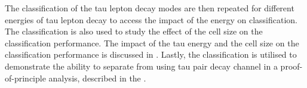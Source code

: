 The classification of the tau lepton decay modes are then  repeated for different energies of tau lepton decay to access the impact of the energy on classification. The classification is also used to study the effect of the \ECAL cell size on the classification performance. The impact of the tau energy and the \ECAL cell size on the classification performance is discussed in . Lastly, the classification is utilised to demonstrate the ability to separate \PHiggs from \PZ using  tau pair decay channel in a proof-of-principle analysis, described in the .







